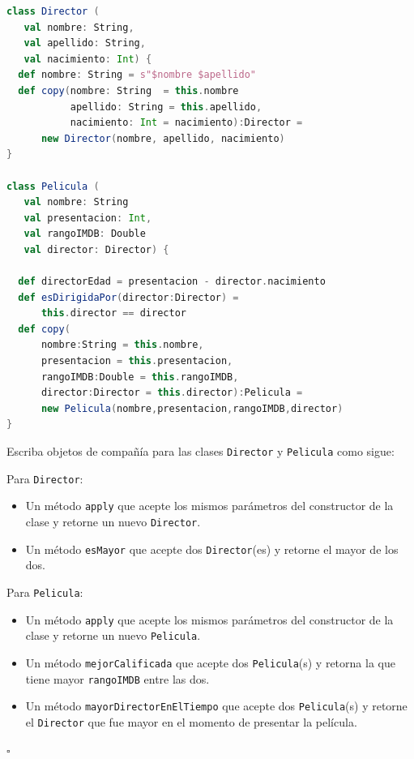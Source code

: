 \documentclass[12pt]{article}
\begin{document}
\begin{lstlisting}[language=Scala]
class Director (
   val nombre: String,
   val apellido: String,
   val nacimiento: Int) { 
  def nombre: String = s"$nombre $apellido"
  def copy(nombre: String  = this.nombre
           apellido: String = this.apellido,
           nacimiento: Int = nacimiento):Director = 
      new Director(nombre, apellido, nacimiento)
}

class Pelicula (
   val nombre: String
   val presentacion: Int,
   val rangoIMDB: Double
   val director: Director) {

  def directorEdad = presentacion - director.nacimiento
  def esDirigidaPor(director:Director) = 
      this.director == director
  def copy(
      nombre:String = this.nombre,
      presentacion = this.presentacion,
      rangoIMDB:Double = this.rangoIMDB,
      director:Director = this.director):Pelicula = 
      new Pelicula(nombre,presentacion,rangoIMDB,director)
}
\end{lstlisting}

Escriba objetos de compañía para las clases \texttt{Director} y \texttt{Pelicula} como sigue:

Para \texttt{Director}:

\begin{itemize}
\item Un método \texttt{apply} que acepte los mismos parámetros del constructor de la clase y retorne un
  nuevo \texttt{Director}.
\item Un método \texttt{esMayor} que acepte dos \texttt{Director}(es) y retorne el mayor de los dos.
\end{itemize}

Para \texttt{Pelicula}:

\begin{itemize}
\item Un método \texttt{apply} que acepte los mismos parámetros del constructor de la clase y retorne un
  nuevo \texttt{Pelicula}.
\item Un método \texttt{mejorCalificada} que acepte dos
  \texttt{Pelicula}(s) y retorna la que tiene mayor \texttt{rangoIMDB}
  entre las dos.
\item Un método \texttt{mayorDirectorEnElTiempo} que acepte dos \texttt{Pelicula}(s) y retorne el \texttt{Director} que fue mayor
  en el momento de presentar la película.
\end{itemize}

$\square$

% 
% 
\end{document}
